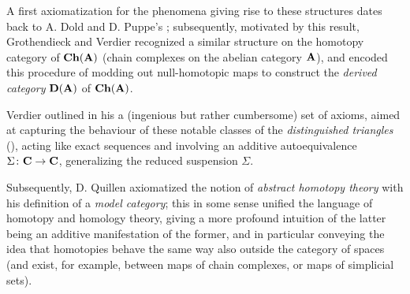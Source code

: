 A first axiomatization for the phenomena giving rise to these structures dates back to A\@. Dold and D\@. Puppe's \cite{Dold1961a}; subsequently, motivated by this result, Grothendieck and Verdier recognized a similar structure on the homotopy category of $\mathbf{Ch}(\mathbf{A})$ (chain complexes on the abelian category $\mathbf{A}$), and encoded this procedure of modding out null\hyp{}homotopic maps to construct the \emph{derived category} $\mathbf{D}(\mathbf{A})$ of $\mathbf{Ch}(\mathbf{A})$.

Verdier outlined in his \cite{Verdier1996} a (ingenious but rather cumbersome) set of axioms, aimed at capturing the behaviour of these notable classes of the \emph{distinguished triangles} (), acting like exact sequences and involving an additive autoequivalence $\Sigma \colon \mathbf{C}\to \mathbf{C}$,  generalizing the reduced suspension $\Sigma$.

Subsequently, D\@. Quillen axiomatized the notion of \emph{abstract homotopy theory} \cite{Baues1989} with his definition of a \emph{model category}; this in some sense unified the language of homotopy and homology theory, giving a more profound intuition of the latter being an additive manifestation of the former, and in particular conveying the idea that homotopies behave the same way also outside the category of spaces (and exist, for example, between maps of chain complexes, or maps of simplicial sets).

